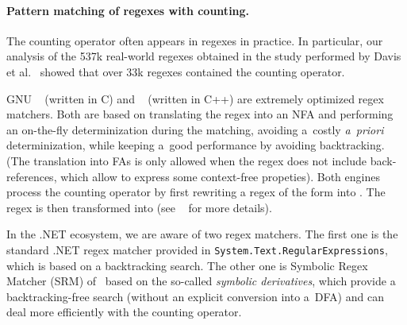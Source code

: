 \documentclass[acmsmall,screen]{acmart}
\newif\ifTR
\begin{document}
\vspace{-0.5mm}
\paragraph{Pattern matching of regexes with counting.}

The counting operator often appears in regexes in practice.
%
In particular, our analysis of the 537k real-world regexes obtained in the study
performed by Davis et al.~\cite{DavisMCSL19} showed that over 33k regexes
contained the counting operator.

GNU \grep~\cite{grep} (written in C) and \retwo~\cite{re2} (written in C++) are
extremely optimized regex matchers.
%
Both are based on translating the regex into an NFA and performing an on-the-fly
determinization during the matching, avoiding a~costly \emph{a~priori}
determinization,
while keeping a~good performance by avoiding backtracking. (The translation into
FAs is only allowed when the regex does not include back-references, which allow to express some context-free propeties).
%
Both engines process the counting operator by first rewriting a regex of the
form  into .
%
The regex  is then transformed into
%
%
(see ~\cite{regexes-in-the-wild} for more details).


In the .NET ecosystem, we are aware of two regex matchers.
%
The first one is the standard .NET regex matcher provided in
\texttt{System.Text.RegularExpressions}, which is based on a backtracking
search.
%
The other one is Symbolic Regex Matcher (SRM) of~\cite{VSXW19} based on the
so-called \emph{symbolic derivatives}, which provide a backtracking-free search
(without an explicit conversion into a~DFA) and can deal more efficiently with
the counting operator.

\ifTR

\fi

\enlargethispage{1mm}
\end{document}

